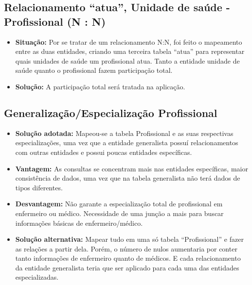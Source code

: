 \documentclass[12pt, a4paper]{article}
\begin{document}
\subsection{Relacionamento “atua”, Unidade de saúde - Profissional (N : N)}
\begin{itemize}
    \item \textbf{Situação:} Por se tratar de um relacionamento N:N, foi feito o mapeamento entre as duas
entidades, criando uma terceira tabela “atua” para representar quais unidades de saúde
um profissional atua. Tanto a entidade unidade de saúde quanto o profissional fazem
participação total.

    \item \textbf{Solução:} A participação total será tratada na aplicação.

\end{itemize}

\subsection{Generalização/Especialização Profissional}
\begin{itemize}
    \item \textbf{Solução adotada:} Mapeou-se a tabela Profissional e as suas respectivas
especializações, uma vez que a entidade generalista possuí relacionamentos com outras
entidades e possui poucas entidades específicas.

    \item \textbf{Vantagem:} As consultas se concentram mais nas entidades específicas, maior
consistência de dados, uma vez que na tabela generalista não terá dados de tipos
diferentes.

    \item \textbf{Desvantagem:} Não garante a especialização total de profissional em enfermeiro ou
médico. Necessidade de uma junção a mais para buscar informações básicas de
enfermeiro/médico.

    \item \textbf{Solução alternativa:} Mapear tudo em uma só tabela “Profissional” e fazer as relações a
partir dela. Porém, o número de nulos aumentaria por conter tanto informações de
enfermeiro quanto de médicos. E cada relacionamento da entidade generalista teria que
ser aplicado para cada uma das entidades especializadas.

\end{itemize}
\end{document}
